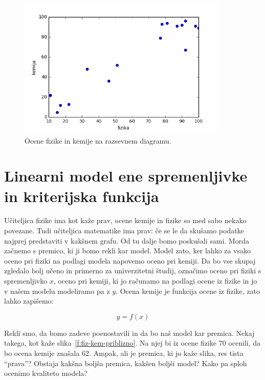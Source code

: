 \begin{figure}[htbp]
\begin{center}
\includegraphics[width=10cm]{slike/fiz-kem.png}
\caption{Ocene fizike in kemije na razsevnem diagramu.}
\label{f:fiz-kem}
\end{center}
\end{figure}

\section{Linearni model ene spremenljivke in kriterijska funkcija}

Učiteljica fizike ima kot kaže prav, ocene kemije in fizike so med
sabo nekako povezane. Tudi učiteljica matematike ima prav: če se le
da skušamo podatke najprej predstaviti v kakšnem grafu. Od tu dalje
bomo poskušali sami. Morda začnemo s premico, ki ji bomo rekli kar
model. Model zato, ker lahko za vsako oceno pri fiziki na podlagi
modela napovemo oceno pri kemiji. Da bo vse skupaj zgledalo bolj učeno
in primerno za univerzitetni študij, označimo oceno pri fiziki s
spremenljivko $x$, oceno pri kemiji, ki jo računamo na podlagi ocene
iz fizike in jo v našem modelu modeliramo pa z $y$. Ocena kemije je
funkcija ocene iz fizike, zato lahko zapišemo:

\begin{equation}
  y = f(x)
\end{equation}

Rekli smo, da bomo zadeve poenostavili in da bo naš model kar
premica. Nekaj takega, kot kaže slika~\ref{f:fiz-kem-priblizno}. Na njej bi iz
ocene fizike 70 ocenili, da bo ocena kemije znašala 62. Ampak, ali je
premica, ki jo kaže slika, res tista ``prava''? Obstaja kakšna boljša
premica, kakšen boljši model? Kako pa sploh ocenimo kvaliteto modela?

